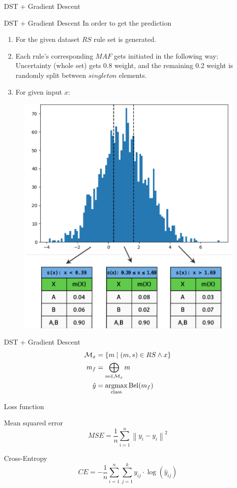\documentclass[aspectratio=169]{beamer}
\begin{document}
\begin{frame}
    \begin{center}
        \Huge DST + Gradient Descent
    \end{center}
\end{frame}

\begin{frame}{DST + Gradient Descent}
    In order to get the prediction
\begin{enumerate}
    \item For the given dataset $RS$ rule set is generated.
    \item Each rule's corresponding $MAF$ gets initiated in the following way: Uncertainty (whole set) gets 0.8 weight, and the remaining 0.2 weight is randomly split between $singleton$ elements.
    \item For given input $x$:
\end{enumerate}
\end{frame}

\begin{frame}
\begin{figure}
    \centering
    \includegraphics[width=0.4\linewidth]{../../fig/image.png}
    \label{fig:image}
\end{figure}
\end{frame}

\begin{frame}{DST + Gradient Descent}
\begin{align*}
\mathcal{M}_x &= \left\{ m \mid (m, s) \in RS \land x \right\} \\
m_f &= \bigoplus_{m \in \mathcal{M}_x} m \\
\hat{y} &= \underset{{\rm class}}{\mathrm{argmax}} \, {\rm Bel}(m_f)
\end{align*}
\end{frame}

\begin{frame}{Loss function}
    \begin{block}{Mean squared error}
        \begin{equation}
MSE = \frac{1}{n} \sum_{i=1}^{n} \left\| y_i - \hat{y}_i \right\|^2
        \end{equation}
    \end{block}
    \begin{block}{Cross-Entropy}
        \begin{equation}
        CE = - \frac{1}{n} \sum_{i=1}^{n} \sum_{j=1}^{k} y_{ij} \cdot \log(\hat{y}_{ij})
        \end{equation}
    \end{block}
\end{frame}
\end{document}
